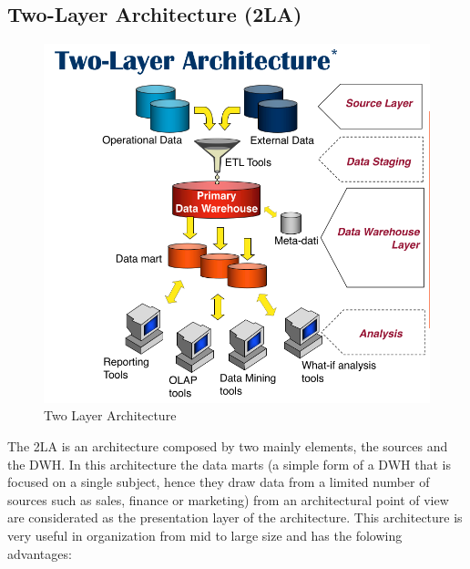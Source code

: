 \documentclass[conference]{IEEEtran}
\begin{document}
	\subsection{Two-Layer Architecture (2LA)}
	\begin{figure}[h]
		\centering
		\includegraphics[width=\columnwidth]{images/two_layer_architecture.png}
		\caption{Two Layer Architecture}
		\label{fig:two layer architecture}
	\end{figure}
	The 2LA is an architecture composed by two mainly elements, the sources and the DWH.
	In this architecture the data marts (a simple form of a DWH that is focused on a single subject, hence they draw data from a limited number of sources such as sales, finance or marketing) from an architectural point of view are considerated as the presentation layer of the architecture.
	This architecture is very useful in organization from mid to large size and has the folowing advantages:
\end{document}
